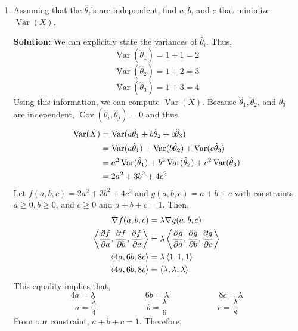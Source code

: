 \documentclass[12pt]{article}
\newcommand*{\Var}[1]{\operatorname{Var}(#1)}
\renewcommand{\vector}[1]{\left\langle{#1}\right\rangle}
\begin{document}
\begin{enumerate}
\begin{enumerate}
\begin{mybox}
        
        \end{mybox}
        \newpage
        \item
        Assuming that the $\hat{\theta}_i$'s are independent, find $a, b$, and $c$ that minimize $\operatorname{Var}(X)$.
                \begin{mybox} \textbf{Solution:} We can explicitly state the variances of $\hat{\theta}_i$. Thus,\\ $$\Var{\hat{\theta}_1} = 1 + 1 = 2$$
        $$\Var{\hat{\theta}_2} = 1 + 2 = 3$$
        $$\Var{\hat{\theta}_3} = 1 + 3 = 4$$
        Using this information, we can compute $\Var{X}$. Because $\hat{\theta}_1, \hat{\theta}_2$, and $\hat{\theta}_3$ are independent, $\operatorname{Cov}(\hat{\theta}_i, \hat{\theta}_j) = 0$ and thus,
        \begin{align}
            \Var{X} 
            &= \Var{a\hat{\theta}_1 + b\hat{\theta}_2 + c\hat{\theta}_3} \notag\\
            &= \Var{a\hat{\theta}_1} + \Var{b\hat{\theta}_2} + \Var{c\hat{\theta}_3}\notag\\
            &= a^2\Var{\hat{\theta}_1} + b^2\Var{\hat{\theta}_2} + c^2\Var{\hat{\theta}_3}\notag\\
            &= 2a^2 + 3b^2 + 4c^2 \notag
        \end{align}
        Let $f(a,b,c) = 2a^2 + 3b^2 + 4c^2$ and $g(a,b,c) = a + b + c$ with constraints $a \geq 0, b \geq 0$, and $c \geq 0$ and $a + b + c = 1$. Then,
        \begin{align}
            \nabla f(a,b,c) &= \lambda \nabla g(a,b,c) \notag\\
            \vector{\frac{\partial f}{\partial a}, \frac{\partial f}{\partial b}, \frac{\partial f}{\partial c}} &= \lambda \vector{\frac{\partial g}{\partial a}, \frac{\partial g}{\partial b}, \frac{\partial g}{\partial c}}\notag\\
            \vector{4a, 6b, 8c} &= \lambda \vector{1,1,1} \notag\\
            \vector{4a, 6b, 8c} &= \vector{\lambda,\lambda,\lambda}\notag
        \end{align}
        This equality implies that,
        $$4a = \lambda \hspace{1in} 6b = \lambda \hspace{1in} 8c = \lambda$$
        $$a = \frac{\lambda}{4} \hspace{1in} b = \frac{\lambda}{6} \hspace{1in} c = \frac{\lambda}{8}$$
        From our constraint, $a + b + c = 1$. Therefore,\\

\end{mybox}
\end{enumerate}
\end{enumerate}
\end{document}
